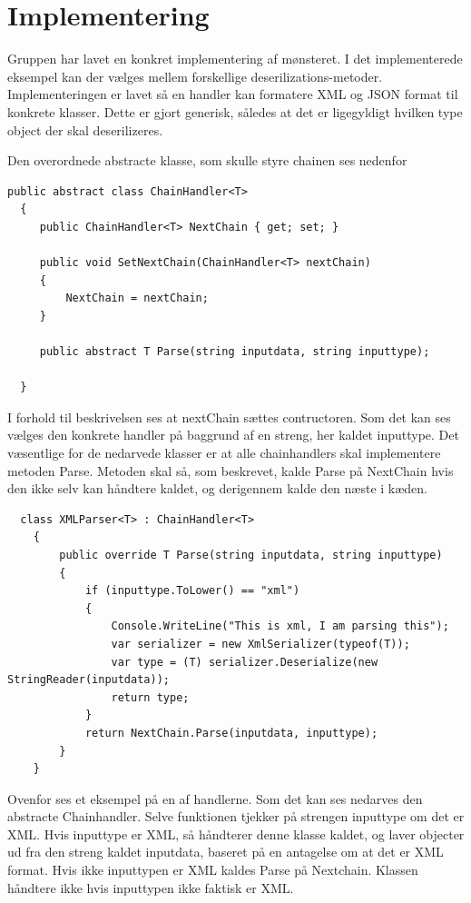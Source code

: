\chapter{Implementering}

Gruppen har lavet en konkret implementering af mønsteret. I det implementerede eksempel kan der vælges mellem forskellige deserilizations-metoder. Implementeringen er lavet så en handler kan formatere XML og JSON format til konkrete klasser. Dette er gjort generisk, således at det er ligegyldigt hvilken type object der skal deserilizeres. 

Den overordnede abstracte klasse, som skulle styre chainen ses nedenfor

\begin{lstlisting}
public abstract class ChainHandler<T>
  {
     public ChainHandler<T> NextChain { get; set; }

     public void SetNextChain(ChainHandler<T> nextChain)
     {
         NextChain = nextChain;
     }

     public abstract T Parse(string inputdata, string inputtype);

  }
\end{lstlisting}  

I forhold til beskrivelsen ses at nextChain sættes contructoren. Som det kan ses vælges den konkrete handler på baggrund af en streng, her kaldet inputtype. Det væsentlige for de nedarvede klasser er at alle chainhandlers skal implementere metoden Parse. Metoden skal så, som beskrevet, kalde Parse på NextChain hvis den ikke selv kan håndtere kaldet, og derigennem kalde den næste i kæden.

\begin{lstlisting}
  class XMLParser<T> : ChainHandler<T>
    {
        public override T Parse(string inputdata, string inputtype)
        {
            if (inputtype.ToLower() == "xml")
            {
                Console.WriteLine("This is xml, I am parsing this");
                var serializer = new XmlSerializer(typeof(T));
                var type = (T) serializer.Deserialize(new StringReader(inputdata));
                return type;
            }
            return NextChain.Parse(inputdata, inputtype);
        }
    }
\end{lstlisting} 

\noindent Ovenfor ses et eksempel på en af handlerne. Som det kan ses nedarves den abstracte Chainhandler. Selve funktionen tjekker på strengen inputtype om det er XML. Hvis inputtype er XML, så håndterer denne klasse kaldet, og laver objecter ud fra den streng kaldet inputdata, baseret på en antagelse om at det er XML format. Hvis ikke inputtypen er XML kaldes Parse på Nextchain. Klassen håndtere ikke hvis inputtypen ikke faktisk er XML. 

